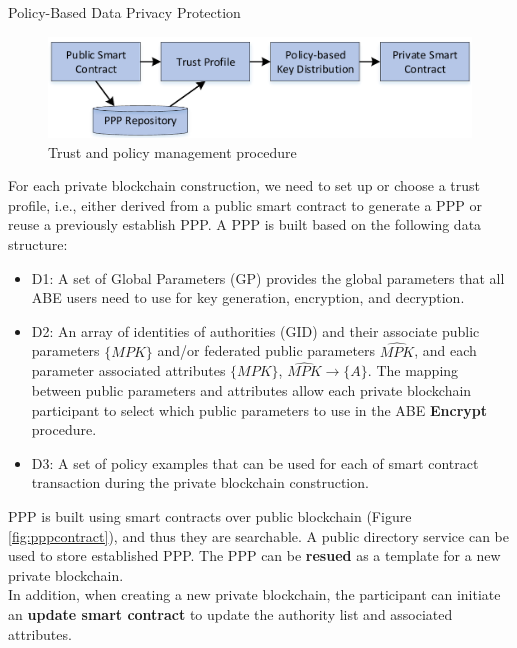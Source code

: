 \documentclass[11pt]{beamer}
\begin{document}
\begin{frame}[allowframebreaks]{Policy-Based Data Privacy Protection}

\begin{figure}
\includegraphics[scale=0.3]{pppdataprotection.png}
\caption{Trust and policy management procedure}
\label{ppptrustpolicy}
\end{figure}

For each private blockchain construction, we need to set up or choose a trust profile, i.e., either derived from a public smart contract to generate a PPP or reuse a previously establish PPP.
\framebreak
A PPP is built based on the following data structure:
\begin{itemize}
\item D1: A set of Global Parameters (GP) provides the global parameters that all ABE users need to use for key generation, encryption, and decryption.
\item D2: An array of identities of authorities ({GID}) and their associate public parameters $\{MPK\}$ and/or federated public parameters $\hat{MPK}$, and each parameter associated attributes $\{MPK\}$, $\hat{MPK} \rightarrow \{A\}$. The mapping between public parameters and attributes allow each private blockchain participant to select which public parameters to use in the ABE \textbf{Encrypt} procedure.
\item D3: A set of policy examples that can be used for each of smart contract transaction during the private blockchain construction.

\end{itemize}

PPP is built using smart contracts over public blockchain (Figure \ref{fig:pppcontract}), and thus they are searchable. A public directory service can be used to store established PPP. The PPP can be \textbf{resued} as a template for a new private blockchain.\\
In addition, when creating a new private blockchain, the participant can initiate an \textbf{update smart contract} to update the authority list and associated attributes.

\end{frame}
\end{document}
